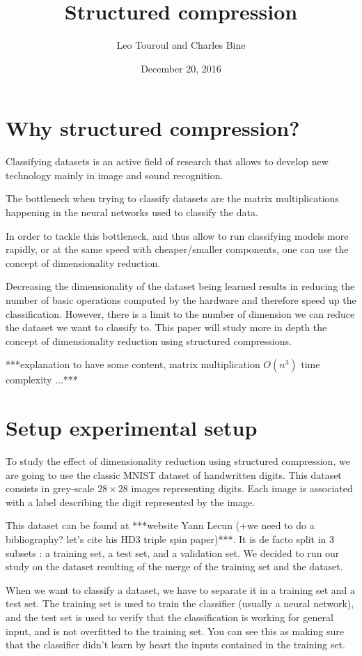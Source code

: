 \documentclass[11pt,a4paper]{article}
\author{Leo Touroul and Charles Bine}
\title{Structured compression}
\date{December 20, 2016}
\begin{document}
	\maketitle

	\section{Why structured compression?}
	Classifying datasets is an active field of research that allows to develop new technology mainly in image and sound recognition.
	
	
	The bottleneck when trying to classify datasets are the matrix multiplications happening in the neural networks used to classify the data.
	
	
	In order to tackle this bottleneck, and thus allow to run classifying models more rapidly, or at the same speed with cheaper/smaller components, one can use the concept of dimensionality reduction.
	
	
	Decreasing the dimensionality of the dataset being learned results in reducing the number of basic operations computed by the hardware and therefore speed up the classification.
	However, there is a limit to the number of dimension we can reduce the dataset we want to classify to. This paper will study more in depth the concept of dimensionality reduction using structured compressions.
	
	
	***explanation to have some content, matrix multiplication $O(n^3)$ time complexity ...***		
	
	\section{Setup experimental setup}
	To study the effect of dimensionality reduction using structured compression, we are going to use the classic MNIST dataset of handwritten digits. This dataset consists in grey-scale $28 \times 28$ images representing digits. Each image is associated with a label describing the digit represented by the image.
	
	
	This dataset can be found at ***website Yann Lecun (+we need to do a bibliography? let's cite his HD3 triple spin paper)***. It is de facto split in 3 subsets : a training set, a test set, and a validation set. We decided to run our study on the dataset resulting of the merge of the training set and the dataset.
	
	
	When we want to classify a dataset, we have to separate it in a training set and a test set. The training set is used to train the classifier (usually a neural network), and the test set is used to verify that the classification is working for general input, and is not overfitted to the training set. You can see this as making sure that the classifier didn't learn by heart the inputs contained in the training set.
	
\end{document}

